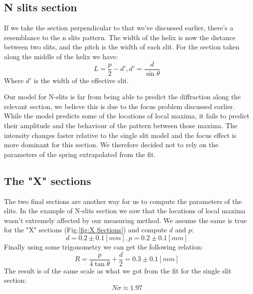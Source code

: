 \subsection{N slits section}
If we take the section perpendicular to that we've discussed earlier, there's a resemblance to the n slits pattern.
The width of the helix is now the distance between two slits, and the pitch is the width of each slit.
For the section taken along the middle of the helix we have: \[L=\frac{p}{2}-d',d'=\frac{d}{\sin \theta}\]
Where $d'$ is the width of the effective slit.

Our model for N-slits is far from being able to predict the diffraction along the relevant section, we believe this is due to the focus problem discussed earlier.
While the model predicts some of the locations of local maxima, it fails to predict their amplitude and the behaviour of the pattern between those maxima.
The intensity changes faster relative to the single slit model and the focus effect is more dominant for this section.
We therefore decided not to rely on the parameters of the spring extrapolated from the fit.

\subsection{The "X" sections}
The two final sections are another way for us to compute the parameters of the slits.
In the example of N-slits section we saw that the locations of local maxima wasn't extremely affected by our measuring method.
We assume the same is true for the "X" sections (Fig.\ref{fig:X Sections}) and compute $d$ and $p$:
\[d=0.2\pm0.1[mm] , p=0.2\pm0.1[mm]\]
Finally using some trigonometry we can get the following relation:
\[R=\frac{p}{4\tan \theta}+\frac{d}{2}=0.3\pm0.1[mm]\]
The result is of the same scale as what we got from the fit for the single slit section:
\[N\sigma\approx 1.97\]

